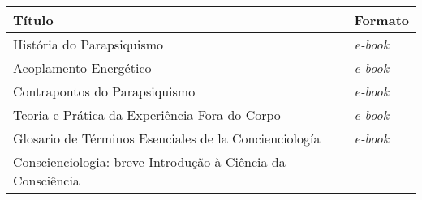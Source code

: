 \documentclass{gescons}
\begin{document}
\begin{longtable}[]{@{}
  >{\raggedright\arraybackslash}p{}
  >{\raggedright\arraybackslash}p{}@{}}
\toprule\noalign{}
\begin{minipage}[b]{\linewidth}\centering
\textbf{Título}
\end{minipage} & \begin{minipage}[b]{\linewidth}\centering
\textbf{Formato}
\end{minipage} \\
\hline
\begin{minipage}[b]{\linewidth}\raggedright
História do Parapsiquismo
\end{minipage} & \begin{minipage}[b]{\linewidth}\raggedright
\emph{e-book}
\end{minipage} \\
\hline
\begin{minipage}[b]{\linewidth}\raggedright
Acoplamento Energético
\end{minipage} & \begin{minipage}[b]{\linewidth}\raggedright
\emph{e-book}
\end{minipage} \\
\hline
\begin{minipage}[b]{\linewidth}\raggedright
Contrapontos do Parapsiquismo
\end{minipage} & \begin{minipage}[b]{\linewidth}\raggedright
\emph{e-book}
\end{minipage} \\
\hline
\begin{minipage}[b]{\linewidth}\raggedright
Teoria e Prática da Experiência Fora do Corpo
\end{minipage} & \begin{minipage}[b]{\linewidth}\raggedright
\emph{e-book}
\end{minipage} \\
\hline
\begin{minipage}[b]{\linewidth}\raggedright
Glosario de Términos Esenciales de la Concienciología
\end{minipage} & \begin{minipage}[b]{\linewidth}\raggedright
\emph{e-book}
\end{minipage} \\
\hline
\begin{minipage}[b]{\linewidth}\raggedright
Conscienciologia: breve Introdução à Ciência da Consciência

\end{minipage}
\end{longtable}
\end{document}

